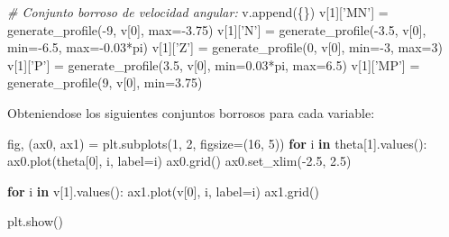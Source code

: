 \documentclass[onecolumn]{article}
\newenvironment{Shaded}{}{}
\newcommand{\BuiltInTok}[1]{#1}
\newcommand{\CommentTok}[1]{\textcolor[rgb]{0.38,0.63,0.69}{\textit{#1}}}
\newcommand{\ControlFlowTok}[1]{\textcolor[rgb]{0.00,0.44,0.13}{\textbf{#1}}}
\newcommand{\DecValTok}[1]{\textcolor[rgb]{0.25,0.63,0.44}{#1}}
\newcommand{\FloatTok}[1]{\textcolor[rgb]{0.25,0.63,0.44}{#1}}
\newcommand{\KeywordTok}[1]{\textcolor[rgb]{0.00,0.44,0.13}{\textbf{#1}}}
\newcommand{\NormalTok}[1]{#1}
\newcommand{\OperatorTok}[1]{\textcolor[rgb]{0.40,0.40,0.40}{#1}}
\newcommand{\StringTok}[1]{\textcolor[rgb]{0.25,0.44,0.63}{#1}}
\begin{document}
\begin{Shaded}
\begin{Highlighting}[]
\CommentTok{# Conjunto borroso de velocidad angular:}
\NormalTok{v.append(\{\})}
\NormalTok{v[}\DecValTok{1}\NormalTok{][}\StringTok{'MN'}\NormalTok{] }\OperatorTok{=}\NormalTok{ generate_profile(}\OperatorTok{-}\DecValTok{9}\NormalTok{, v[}\DecValTok{0}\NormalTok{], }\BuiltInTok{max}\OperatorTok{=-}\FloatTok{3.75}\NormalTok{)}
\NormalTok{v[}\DecValTok{1}\NormalTok{][}\StringTok{'N'}\NormalTok{] }\OperatorTok{=}\NormalTok{ generate_profile(}\OperatorTok{-}\FloatTok{3.5}\NormalTok{, v[}\DecValTok{0}\NormalTok{], }\BuiltInTok{min}\OperatorTok{=-}\FloatTok{6.5}\NormalTok{, }\BuiltInTok{max}\OperatorTok{=-}\FloatTok{0.03}\OperatorTok{*}\NormalTok{pi)}
\NormalTok{v[}\DecValTok{1}\NormalTok{][}\StringTok{'Z'}\NormalTok{] }\OperatorTok{=}\NormalTok{ generate_profile(}\DecValTok{0}\NormalTok{, v[}\DecValTok{0}\NormalTok{], }\BuiltInTok{min}\OperatorTok{=-}\DecValTok{3}\NormalTok{, }\BuiltInTok{max}\OperatorTok{=}\DecValTok{3}\NormalTok{)}
\NormalTok{v[}\DecValTok{1}\NormalTok{][}\StringTok{'P'}\NormalTok{] }\OperatorTok{=}\NormalTok{ generate_profile(}\FloatTok{3.5}\NormalTok{, v[}\DecValTok{0}\NormalTok{], }\BuiltInTok{min}\OperatorTok{=}\FloatTok{0.03}\OperatorTok{*}\NormalTok{pi, }\BuiltInTok{max}\OperatorTok{=}\FloatTok{6.5}\NormalTok{)}
\NormalTok{v[}\DecValTok{1}\NormalTok{][}\StringTok{'MP'}\NormalTok{] }\OperatorTok{=}\NormalTok{ generate_profile(}\DecValTok{9}\NormalTok{, v[}\DecValTok{0}\NormalTok{], }\BuiltInTok{min}\OperatorTok{=}\FloatTok{3.75}\NormalTok{)}
\end{Highlighting}
\end{Shaded}

Obteniendose los siguientes conjuntos borrosos para cada variable:

\begin{Shaded}
\begin{Highlighting}[]
\NormalTok{fig, (ax0, ax1) }\OperatorTok{=}\NormalTok{ plt.subplots(}\DecValTok{1}\NormalTok{, }\DecValTok{2}\NormalTok{, figsize}\OperatorTok{=}\NormalTok{(}\DecValTok{16}\NormalTok{, }\DecValTok{5}\NormalTok{))}
\ControlFlowTok{for}\NormalTok{ i }\KeywordTok{in}\NormalTok{ theta[}\DecValTok{1}\NormalTok{].values():}
\NormalTok{    ax0.plot(theta[}\DecValTok{0}\NormalTok{], i, label}\OperatorTok{=}\NormalTok{i)}
\NormalTok{ax0.grid()}
\NormalTok{ax0.set_xlim(}\OperatorTok{-}\FloatTok{2.5}\NormalTok{, }\FloatTok{2.5}\NormalTok{)}

\ControlFlowTok{for}\NormalTok{ i }\KeywordTok{in}\NormalTok{ v[}\DecValTok{1}\NormalTok{].values():}
\NormalTok{    ax1.plot(v[}\DecValTok{0}\NormalTok{], i, label}\OperatorTok{=}\NormalTok{i)}
\NormalTok{ax1.grid()}

\NormalTok{plt.show()}
\end{Highlighting}
\end{Shaded}
\end{document}
